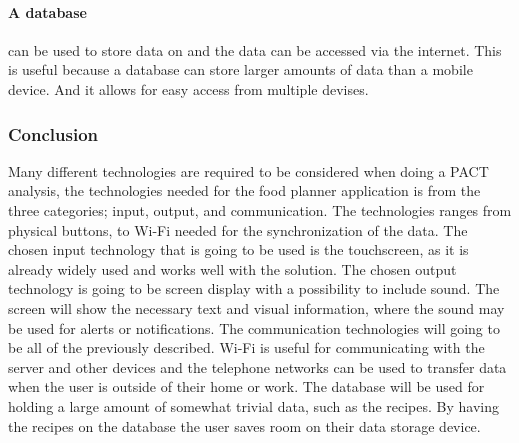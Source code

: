 \paragraph{A database} can be used to store data on and the data can be accessed via the internet. This is useful because a database can store larger amounts of data than a mobile device. And it allows for easy access from multiple devises.
 
\subsubsection{Conclusion}
Many different technologies are required to be considered when doing a PACT analysis, the technologies needed for the food planner application is from the three categories; input, output, and communication.
The technologies ranges from physical buttons, to Wi-Fi needed for the synchronization of the data. The chosen input technology that is going to be used is the touchscreen, as it is already widely used and works well with the solution. The chosen output technology is going to be screen display with a possibility  to include sound. The screen will show the necessary text and visual information, where the sound may be used for alerts or notifications. The communication technologies will going to be all of the previously described. Wi-Fi is useful for communicating with the server and other devices and the telephone networks can be used to transfer data when the user is outside of their home or work. The database will be used for holding a large amount of somewhat trivial data, such as the recipes. By having the recipes on the database the user saves room on their data storage device.
